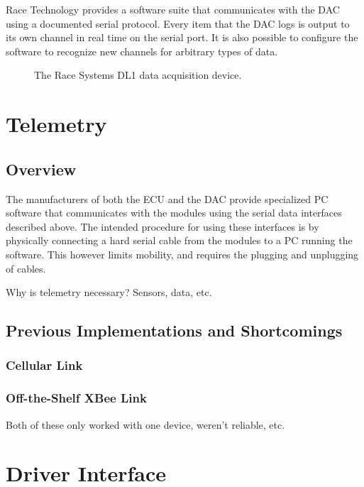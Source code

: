 Race Technology provides a software suite that communicates with the DAC using a documented serial protocol. Every item that the DAC logs is output to its own channel in real time on the serial port. It is also possible to configure the software to recognize new channels for arbitrary types of data.

\begin{figure}[H]
\centering
\caption{The Race Systems DL1 data acquisition device.}
\label{fig:dl1_product}
\end{figure}


\section{Telemetry}

\subsection{Overview}

The manufacturers of both the ECU and the DAC provide specialized PC software that communicates with the modules using the serial data interfaces described above. The intended procedure for using these interfaces is by physically connecting a hard serial cable from the modules to a PC running the software. This however limits mobility, and requires the plugging and unplugging of cables.

Why is telemetry necessary? Sensors, data, etc.

\subsection{Previous Implementations and Shortcomings}


\subsubsection{Cellular Link}


\subsubsection{Off-the-Shelf XBee Link}

Both of these only worked with one device, weren't reliable, etc.


\section{Driver Interface}


